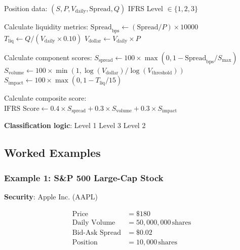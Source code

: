 \documentclass[11pt,a4paper]{article}
\begin{document}
\begin{algorithm}
\caption{IFRS Level Classification}
\begin{algorithmic}[1]
\Require Position data: $(S, P, V_{\text{daily}}, \text{Spread}, Q)$
\Ensure IFRS Level $\in \{1, 2, 3\}$

\State Calculate liquidity metrics:
\State \quad $\text{Spread}_{\text{bps}} \gets (\text{Spread} / P) \times 10000$
\State \quad $T_{\text{liq}} \gets Q / (V_{\text{daily}} \times 0.10)$
\State \quad $V_{\text{dollar}} \gets V_{\text{daily}} \times P$

\State Calculate component scores:
\State \quad $S_{\text{spread}} \gets 100 \times \max(0, 1 - \text{Spread}_{\text{bps}} / S_{\max})$
\State \quad $S_{\text{volume}} \gets 100 \times \min(1, \log(V_{\text{dollar}}) / \log(V_{\text{threshold}}))$
\State \quad $S_{\text{impact}} \gets 100 \times \max(0, 1 - T_{\text{liq}} / 15)$

\State Calculate composite score:
\State \quad $\text{IFRS Score} \gets 0.4 \times S_{\text{spread}} + 0.3 \times S_{\text{volume}} + 0.3 \times S_{\text{impact}}$

\State \textbf{Classification logic}:
    \State \Return Level 1
    \State \Return Level 3
\Else
    \State \Return Level 2
\EndIf
\end{algorithmic}
\end{algorithm}

\subsection{Worked Examples}

\subsubsection{Example 1: S\&P 500 Large-Cap Stock}

\textbf{Security}: Apple Inc. (AAPL)

\begin{align*}
\text{Price} &= \$180 \\
\text{Daily Volume} &= 50,000,000\,\text{shares} \\
\text{Bid-Ask Spread} &= \$0.02 \\
\text{Position} &= 10,000\,\text{shares}
\end{align*}
\end{document}
